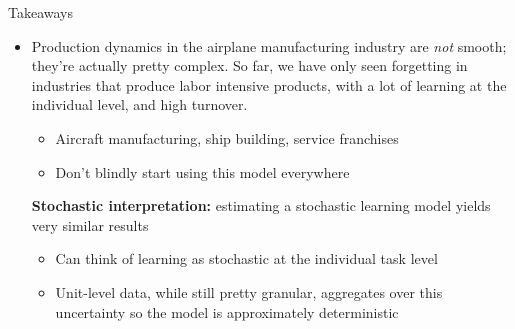 \documentclass[dvipsnames]{beamer}
\begin{document}
%
\begin{frame}{Takeaways}
  \begin{itemize}
  \item Production dynamics in the airplane manufacturing industry are \emph{not} smooth; they're actually pretty complex.
    \vitem So far, we have only seen forgetting in industries that produce labor intensive products, with a lot of learning at the individual level, and high turnover.
    \begin{itemize}
    \item Aircraft manufacturing, ship building, service franchises
      \item Don't blindly start using this model everywhere
    \end{itemize}
    \vitem \textbf{Stochastic interpretation:} estimating a stochastic learning model yields very similar results
    \begin{itemize}
    \item Can think of learning as stochastic at the individual task level
      \item Unit-level data, while still pretty granular, aggregates over this uncertainty so the model is approximately deterministic
    \end{itemize}
  \end{itemize}
\end{frame}
\end{document}
